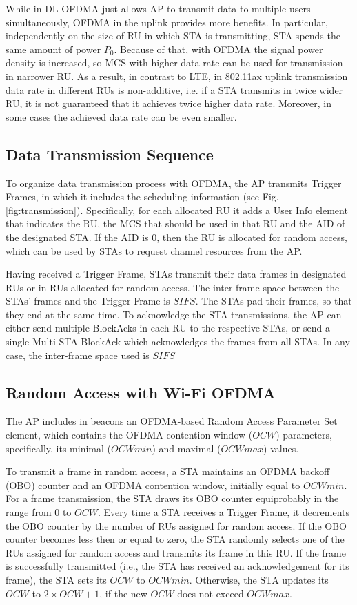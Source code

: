 While in DL OFDMA just allows AP to transmit data to multiple users simultaneously, OFDMA in the uplink provides more benefits. In particular, independently on the size of RU in which STA is transmitting, STA spends the same amount of power $P_0$. Because of that, with OFDMA the signal power density is increased, so MCS with higher data rate can be used for transmission in narrower RU. As a result, in contrast to LTE, in 802.11ax uplink transmission data rate in different RUs is non-additive, i.e. if a STA transmits in twice wider RU, it is not guaranteed that it achieves twice higher data rate. Moreover, in some cases the achieved data rate can be even smaller.

\subsection{Data Transmission Sequence}
To organize data transmission process with OFDMA, the AP transmits Trigger Frames, in which it includes the scheduling information (see Fig. \ref{fig:transmission}).
Specifically, for each allocated RU it adds a User Info element that indicates the RU, the MCS that should be used in that RU and the AID of the designated STA.
If the AID is $0$, then the RU is allocated for random access, which can be used by STAs to request channel resources from the AP.

Having received a Trigger Frame, STAs transmit their data frames in designated RUs or in RUs allocated for random access.
The inter-frame space between the STAs' frames and the Trigger Frame is $SIFS$.
The STAs pad their frames, so that they end at the same time.
To acknowledge the STA transmissions, the AP can either send multiple BlockAcks in each RU to the respective STAs, or send a single Multi-STA BlockAck which acknowledges the frames from all STAs.
In any case, the inter-frame space used is $SIFS$




\subsection{Random Access with Wi-Fi OFDMA}
The AP includes in beacons an OFDMA-based Random Access Parameter Set element, which contains the OFDMA contention window ($OCW$) parameters, specifically, its minimal ($OCWmin$) and maximal ($OCWmax$) values.

To transmit a frame in random access, a STA maintains an OFDMA backoff (OBO) counter and an OFDMA contention window, initially equal to $OCWmin$.
For a frame transmission, the STA draws its OBO counter equiprobably in the range from $0$ to $OCW$.
Every time a STA receives a Trigger Frame, it decrements the OBO counter by the number of RUs assigned for random access.
If the OBO counter becomes less then or equal to zero, the STA randomly selects one of the RUs assigned for random access and transmits its frame in this RU.
If the frame is successfully transmitted (i.e., the STA has received an acknowledgement for its frame), the STA sets its $OCW$ to $OCWmin$.
Otherwise, the STA updates its $OCW$ to $2 \times OCW + 1$, if the new $OCW$ does not exceed $OCWmax$.


